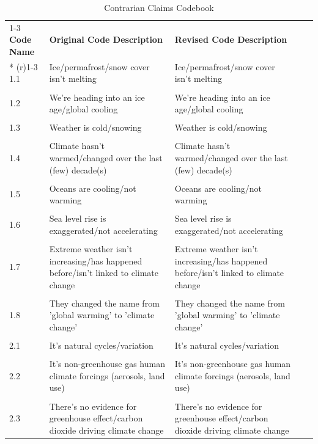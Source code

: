 \documentclass{article}
\begin{document}
\begin{longtable}{@{}lp{6.5cm}p{6.5cm}ll@{}}
\caption{Contrarian Claims Codebook}\\
\cmidrule(r){1-3}
\textbf{Code   Name} &
  \textbf{Original   Code Description} &
  \textbf{Revised   Code Description} &
   &
   \\* \cmidrule(r){1-3}
\endfirsthead
%
\endhead
%
1.1 &
  Ice/permafrost/snow cover isn't melting &
  Ice/permafrost/snow cover isn't melting &
   &
   \\ \\
1.2 &
  We're heading into an ice age/global cooling &
  We're heading into an ice age/global cooling &
   &
   \\ \\
1.3 &
  Weather is cold/snowing &
  Weather is cold/snowing &
   &
   \\ \\
1.4 &
  Climate hasn't warmed/changed over the last (few) decade(s) &
  Climate hasn't warmed/changed over the last (few) decade(s) &
   &
   \\ \\
1.5 &
  Oceans are cooling/not warming &
  Oceans are cooling/not warming &
   &
   \\ \\
1.6 &
  Sea level rise is exaggerated/not accelerating &
  Sea level rise is exaggerated/not accelerating &
   &
   \\ \\
1.7 &
  Extreme weather isn't increasing/has happened before/isn't   linked to climate change &
  Extreme weather isn't increasing/has happened before/isn't   linked to climate change &
   &
   \\ \\
1.8 &
  They changed the name from 'global warming' to 'climate change' &
  They changed the name from 'global warming' to 'climate change' &
   &
   \\ \\
2.1 &
  It's natural cycles/variation &
  It's natural cycles/variation &
   &
   \\ \\
2.2 &
  It's non-greenhouse gas human climate forcings (aerosols, land   use) &
  It's non-greenhouse gas human climate forcings (aerosols, land   use) &
   &
   \\ \\
2.3 &
  There's no evidence for greenhouse effect/carbon dioxide driving   climate change &
  There's no evidence for greenhouse effect/carbon dioxide driving   climate change &

\end{longtable}
\end{document}
